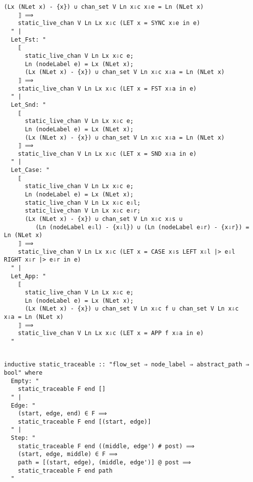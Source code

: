 \documentclass{article}
\begin{document}
\begin{lstlisting}[style=codestyle1, escapechar=\%]
      (Lx (NLet x) - {x}) ∪ chan_set V Ln x⇩c x⇩e = Ln (NLet x)
    ⟧ ⟹
    static_live_chan V Ln Lx x⇩c (LET x = SYNC x⇩e in e)
  " |
  Let_Fst: "
    ⟦
      static_live_chan V Ln Lx x⇩c e;
      Ln (nodeLabel e) = Lx (NLet x);
      (Lx (NLet x) - {x}) ∪ chan_set V Ln x⇩c x⇩a = Ln (NLet x)
    ⟧ ⟹
    static_live_chan V Ln Lx x⇩c (LET x = FST x⇩a in e)
  " |
  Let_Snd: "
    ⟦
      static_live_chan V Ln Lx x⇩c e;
      Ln (nodeLabel e) = Lx (NLet x);
      (Lx (NLet x) - {x}) ∪ chan_set V Ln x⇩c x⇩a = Ln (NLet x)
    ⟧ ⟹
    static_live_chan V Ln Lx x⇩c (LET x = SND x⇩a in e)
  " |
  Let_Case: "
    ⟦
      static_live_chan V Ln Lx x⇩c e;
      Ln (nodeLabel e) = Lx (NLet x);
      static_live_chan V Ln Lx x⇩c e⇩l;
      static_live_chan V Ln Lx x⇩c e⇩r;
      (Lx (NLet x) - {x}) ∪ chan_set V Ln x⇩c x⇩s ∪ 
         (Ln (nodeLabel e⇩l) - {x⇩l}) ∪ (Ln (nodeLabel e⇩r) - {x⇩r}) = Ln (NLet x)
    ⟧ ⟹
    static_live_chan V Ln Lx x⇩c (LET x = CASE x⇩s LEFT x⇩l |> e⇩l RIGHT x⇩r |> e⇩r in e)
  " |
  Let_App: "
    ⟦
      static_live_chan V Ln Lx x⇩c e;
      Ln (nodeLabel e) = Lx (NLet x);
      (Lx (NLet x) - {x}) ∪ chan_set V Ln x⇩c f ∪ chan_set V Ln x⇩c x⇩a = Ln (NLet x)
    ⟧ ⟹
    static_live_chan V Ln Lx x⇩c (LET x = APP f x⇩a in e)
  "

  \end{lstlisting}


\begin{lstlisting}[style=codestyle1, escapechar=\%]

inductive static_traceable :: "flow_set ⇒ node_label ⇒ abstract_path ⇒ bool" where
  Empty: "
    static_traceable F end []
  " |
  Edge: "
    (start, edge, end) ∈ F ⟹
    static_traceable F end [(start, edge)]
  " |
  Step: "
    static_traceable F end ((middle, edge') # post) ⟹
    (start, edge, middle) ∈ F ⟹
    path = [(start, edge), (middle, edge')] @ post ⟹
    static_traceable F end path
  "

  \end{lstlisting}
\end{document}
